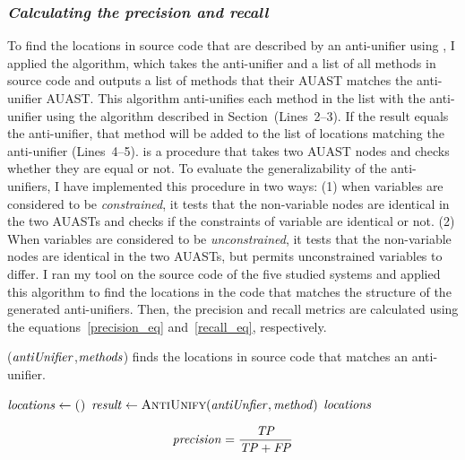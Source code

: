 \subsubsection{\emph{Calculating the precision and recall}}  \label{precision}
To find the locations in source code that are described by an anti-unifier using , I applied the  algorithm, which takes the anti-unifier and a list of all methods in source code and outputs a list of methods that their AUAST matches the anti-unifier AUAST. This algorithm anti-unifies each method in the list with the anti-unifier using the  algorithm described in Section~\label{meth-antiUnifier}(Lines~2--3). If the result equals the anti-unifier, that method will be added to the list of locations matching the anti-unifier (Lines~4--5).  is a procedure that takes two AUAST nodes and checks whether they are equal or not. To evaluate the generalizability of the anti-unifiers, I have implemented this procedure in two ways: (1) when variables are considered to be \emph{constrained}, it tests that the non-variable nodes are identical in the two AUASTs and checks if the constraints of variable are identical or not. (2) When variables are considered to be \emph{unconstrained}, it tests that the non-variable nodes are identical in the two AUASTs, but permits unconstrained variables to differ. I ran my tool on the source code of the five studied systems and applied this algorithm to find the locations in the code that matches the structure of the generated anti-unifiers. Then, the precision and recall metrics are calculated using the equations~\ref{precision_eq} and~\ref{recall_eq}, respectively.


\begin{algorithm}
\caption{($\mathit{antiUnifier}$,$\mathit{methods}$) finds the locations in source code that matches an anti-unifier.}
\label{alg-determine}
\begin{algorithmic}[1]
\DetermineLocations
    \State $\mathit{locations} \gets \textsc{()}$
    \State $\mathit{result} \gets  \textsc{AntiUnify}(\mathit{antiUnfier},\mathit{method})$
		\EndIf 		
		\EndFor
 \Return $\mathit{locations} $  	
  \end{algorithmic}
\end{algorithm}

\begin{equation}\label{precision_eq}
\mathit{precision} = \frac{\mathit{TP}}{{\mathit{TP}+\mathit{FP}}}
\end{equation}
 


